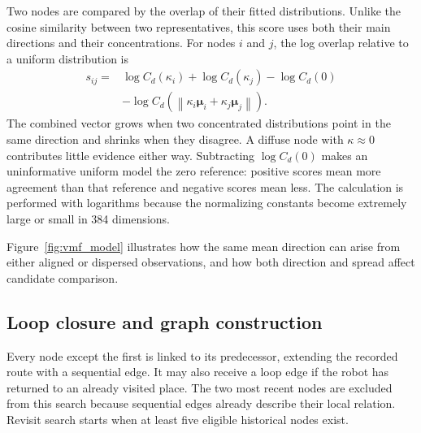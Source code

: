 \documentclass[5p,twocolumn,nonatbib,reversenotenum]{elsarticle}
\begin{document}
Two nodes are compared by the overlap of their fitted distributions. Unlike the cosine similarity between two representatives, this score uses both their main directions and their concentrations. For nodes $i$ and $j$, the log overlap relative to a uniform distribution is
\begin{equation}    
\label{eq:vmf-overlap}
\begin{split}
    s_{ij}={}&\log C_d(\kappa_i)+\log C_d(\kappa_j)-\log C_d(0)\\
    &-\log C_d\!\left(\left\lVert\kappa_i\boldsymbol{\mu}_i+
    \kappa_j\boldsymbol{\mu}_j\right\rVert\right).
\end{split}
\end{equation}
The combined vector grows when two concentrated distributions point in the same direction and shrinks when they disagree. A diffuse node with $\kappa\approx0$ contributes little evidence either way. Subtracting $\log C_d(0)$ makes an uninformative uniform model the zero reference: positive scores mean more agreement than that reference and negative scores mean less. The calculation is performed with logarithms because the normalizing constants become extremely large or small in 384 dimensions.

Figure~\ref{fig:vmf_model} illustrates how the same mean direction can arise from either aligned or dispersed observations, and how both direction and spread affect candidate comparison.

\subsection{Loop closure and graph construction}
\label{sec:loop-closure}
Every node except the first is linked to its predecessor, extending the recorded route with a sequential edge. It may also receive a loop edge if the robot has returned to an already visited place. The two most recent nodes are excluded from this search because sequential edges already describe their local relation. Revisit search starts when at least five eligible historical nodes exist.
\end{document}
